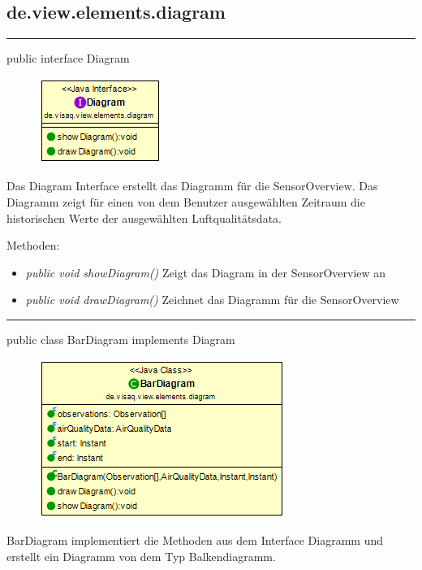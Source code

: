 
\subsection{de.view.elements.diagram}

\rule{\textwidth}{0.4pt} 
public interface Diagram

\begin{minipage}{0.3\textwidth}
    \begin{figure}[H]
        \includegraphics[scale = 0.7]{media/frontend/view/de.view.elements.diagram/Diagram_Class.png}
    \end{figure}
    \end{minipage} \hfill
    \begin{minipage}{0.6\textwidth}
Das Diagram Interface erstellt das Diagramm für die SensorOverview. Das Diagramm zeigt für einen von dem Benutzer ausgewählten Zeitraum die historischen Werte der ausgewählten Luftqualitätsdata.
\end{minipage}

Methoden:
\begin{itemize} 
    \item \emph{public void showDiagram()} Zeigt das Diagram in der SensorOverview an
    \item \emph{public void drawDiagram()} Zeichnet das Diagramm für die SensorOverview
\end{itemize}

\rule{\textwidth}{0.4pt} 
public class BarDiagram implements Diagram

\begin{minipage}{0.3\textwidth}
    \begin{figure}[H]
        \includegraphics[scale = 0.5]{media/frontend/view/de.view.elements.diagram/BarDiagram_Class.png}
    \end{figure}
    \end{minipage} \hfill
    \begin{minipage}{0.6\textwidth}
BarDiagram implementiert die Methoden aus dem Interface Diagramm und erstellt ein Diagramm von dem Typ Balkendiagramm.
\end{minipage}

